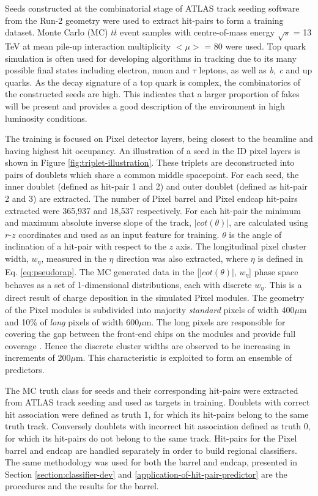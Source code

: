 Seeds constructed at the combinatorial stage of ATLAS track seeding software from the Run-2 geometry were used to extract hit-pairs to form a training dataset. Monte Carlo (MC) $t\bar{t}$ event samples with centre-of-mass energy $\sqrt{s}$ = 13 TeV at mean pile-up interaction multiplicity $< \mu >$ = 80 were used. Top quark simulation is often used for developing algorithms in tracking due to its many possible final states including electron, muon and $\tau$ leptons, as well as \textit{b, c} and up quarks. As the decay signature of a top quark is complex, the combinatorics of the constructed seeds are high. This indicates that a larger proportion of fakes will be present and provides a good description of the environment in high luminosity conditions.

The training is focused on Pixel detector layers, being closest to the beamline and having highest hit occupancy. An illustration of a seed in the ID pixel layers is shown in Figure \ref{fig:triplet-illustration}. These triplets are deconstructed into pairs of doublets which share a common middle spacepoint. For each seed, the inner doublet (defined as hit-pair 1 and 2) and outer doublet (defined as hit-pair 2 and 3) are extracted. The number of Pixel barrel and Pixel endcap hit-pairs extracted were 365,937 and 18,537 respectively. For each hit-pair the minimum and maximum absolute inverse slope of the track, $|cot(\theta)|$, are calculated using $r$-$z$ coordinates and used as an input feature for training. $\theta$ is the angle of inclination of a hit-pair with respect to the $z$ axis. The longitudinal pixel cluster width, $w_{\eta}$, measured in the $\eta$ direction was also extracted, where $\eta$ is defined in Eq. \ref{eq:pseudorap}. The MC generated data in the [$|cot(\theta)|$, $w_{\eta}$] phase space behaves as a set of 1-dimensional distributions, each with discrete $w_{\eta}$. This is a direct result of charge deposition in the simulated Pixel modules. The geometry of the Pixel modules is subdivided into majority \textit{standard} pixels of width 400$\mu$m and 10\% of \textit{long} pixels of width 600$\mu$m. The long pixels are responsible for covering the gap between the front-end chips on the modules and provide full coverage \cite{pixel-module-dimensions}. Hence the discrete cluster widths are observed to be increasing in increments of 200$\mu$m. This characteristic is exploited to form an ensemble of predictors. 

The MC truth class for seeds and their corresponding hit-pairs were extracted from ATLAS track seeding and used as targets in training. Doublets with correct hit association were defined as truth 1, for which its hit-pairs belong to the same truth track. Conversely doublets with incorrect hit association defined as truth 0, for which its hit-pairs do not belong to the same track. Hit-pairs for the Pixel barrel and endcap are handled separately in order to build regional classifiers. The same methodology was used for both the barrel and endcap, presented in Section \ref{section:classifier-dev} and \ref{application-of-hit-pair-predictor} are the procedures and the results for the barrel.


